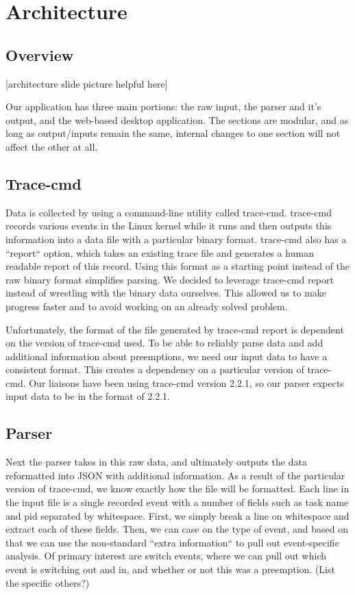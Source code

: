 \documentclass{hmcclinic}
\begin{document}
\section{Architecture} %

  \subsection{Overview}

  [architecture slide picture helpful here]

  Our application has three main portions: the raw input, the parser and it's
  output, and the web-based desktop application. The sections are modular, and
  as long as output/inputs remain the same, internal changes to one section will
  not affect the other at all.

  \subsection{Trace-cmd}

  Data is collected by using a command-line utility called trace-cmd.
  trace-cmd records various events in the Linux kernel while it runs and then
  outputs this information into a data file with a particular binary format.
  trace-cmd also has a ``report`` option, which takes an existing trace file and
  generates a human readable report of this record. Using this format as a
  starting point instead of the raw binary format simplifies parsing.  We
  decided to leverage trace-cmd report instead of wrestling with the binary data
  ourselves. This allowed us to make progress faster and to avoid working on an
  already solved problem.

   Unfortunately, the format of the file generated by trace-cmd report is
   dependent on the version of trace-cmd used. To be able to reliably parse data
   and add additional information about preemptions, we need our input data to
   have a consistent format. This creates a dependency on a particular version
   of trace-cmd. Our liaisons have been using trace-cmd version 2.2.1, so our
   parser expects input data to be in the format of 2.2.1.


  \subsection{Parser}
  Next the parser takes in this raw data, and ultimately outputs the data
  reformatted into JSON with additional information. As a result of the
  particular version of trace-cmd, we know exactly how the file will be
  formatted. Each line in the input file is a single recorded event with a
  number of fields such as task name and pid separated by whitespace. First, we
  simply break a line on whitespace and extract each of these fields. Then, we
  can case on the type of event, and based on that we can use the non-standard
  ``extra information`` to pull out event-specific analysis. Of primary interest
  are switch events, where we can pull out which event is switching out and in,
  and whether or not this was a preemption. (List the specific others?)
\end{document}
